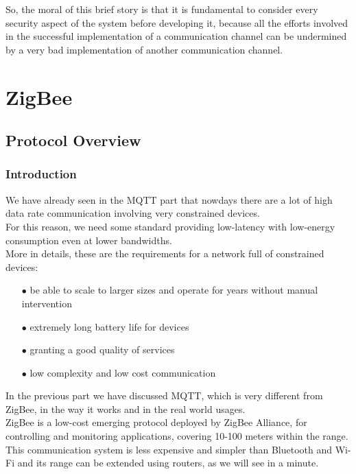 \documentclass[12pt]{report}
\begin{document}
{So, the moral of this brief story is that it is fundamental to consider every security aspect of the system before developing it, because all the efforts involved in the successful implementation of a communication channel can be undermined by a very bad implementation of another communication channel.\\


\part{ZigBee}

\chapter{Protocol Overview}

\section{Introduction}
\bigskip

We have already seen in the MQTT part that nowdays there are a lot of high data rate communication involving very constrained devices.\\
For this reason, we need some standard providing low-latency with low-energy consumption even at lower bandwidths.\\

More in details, these are the requirements for a network full of constrained devices:

\begin{itemize}
\setlength{\itemindent}{+4mm}
\item[$\bullet$] be able to scale to larger sizes and operate for years without manual intervention
\item[$\bullet$] extremely long battery life for devices
\item[$\bullet$] granting a good quality of services
\item[$\bullet$] low complexity and low cost communication
\end{itemize}


In the previous part we have discussed MQTT, which is very different from ZigBee, in the way it works and in the real world usages.\\

ZigBee is a low-cost emerging protocol deployed by ZigBee Alliance, for controlling and monitoring applications, covering 10-100 meters within the range. \\
This communication system is less expensive and simpler than Bluetooth and Wi-Fi and its range can be extended using routers, as we will see in a minute.\\

}
\end{document}
